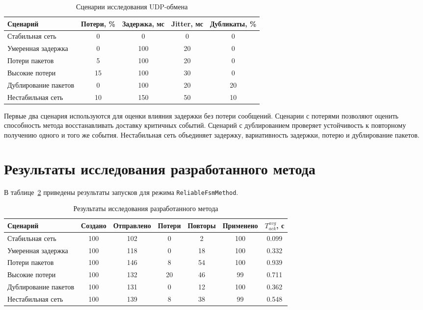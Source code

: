 \begin{table}[H]
	\caption{Сценарии исследования UDP-обмена}
	\label{tab:research-scenarios}
	\centering
	\renewcommand{\arraystretch}{1.2}
	\begin{tabular}{|p{4cm}|c|c|c|c|}
		\hline
		Сценарий & Потери, \% & Задержка, мс & Jitter, мс & Дубликаты, \% \\ \hline
		Стабильная сеть & 0 & 0 & 0 & 0 \\ \hline
		Умеренная задержка & 0 & 100 & 20 & 0 \\ \hline
		Потери пакетов & 5 & 100 & 20 & 0 \\ \hline
		Высокие потери & 15 & 100 & 30 & 0 \\ \hline
		Дублирование пакетов & 0 & 100 & 20 & 20 \\ \hline
		Нестабильная сеть & 10 & 150 & 50 & 10 \\ \hline
	\end{tabular}
\end{table}

Первые два сценария используются для оценки влияния задержки без потери сообщений. Сценарии с потерями позволяют оценить способность метода восстанавливать доставку критичных событий. Сценарий с дублированием проверяет устойчивость к повторному получению одного и того же события. Нестабильная сеть объединяет задержку, вариативность задержки, потерю и дублирование пакетов.

\section{Результаты исследования разработанного метода}

В таблице~\ref{tab:research-reliable-results} приведены результаты запусков для режима \texttt{ReliableFsmMethod}. 

\begin{table}[H]
	\caption{Результаты исследования разработанного метода}
	\label{tab:research-reliable-results}
	\centering
	\small
	\renewcommand{\arraystretch}{1.2}
	\begin{tabular}{|p{3.2cm}|c|c|c|c|c|c|}
		\hline
		Сценарий & Создано & Отправлено & Потери & Повторы & Применено & $T_{ack}^{avg}$, с \\ \hline
		Стабильная сеть & 100 & 102 & 0 & 2 & 100 & 0.099 \\ \hline
		Умеренная задержка & 100 & 118 & 0 & 18 & 100 & 0.332 \\ \hline
		Потери пакетов & 100 & 146 & 8 & 54 & 100 & 0.939 \\ \hline
		Высокие потери & 100 & 132 & 20 & 46 & 99 & 0.711 \\ \hline
		Дублирование пакетов & 100 & 131 & 0 & 12 & 100 & 0.362 \\ \hline
		Нестабильная сеть & 100 & 139 & 8 & 38 & 99 & 0.548 \\ \hline
	\end{tabular}
\end{table}

